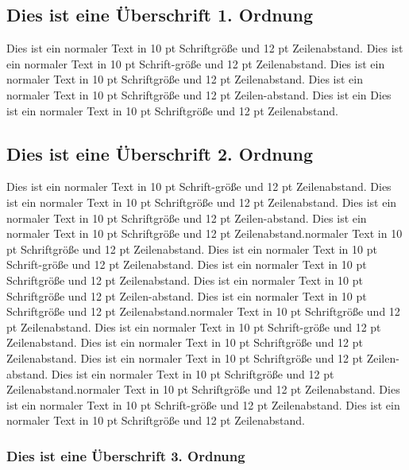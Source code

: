 \documentclass[10pt,a4paper,oneside,abstracton]{scrartcl}
\begin{document}
\begin{multicols}{2}
\section{Dies ist eine Überschrift 1. Ordnung}
Dies ist ein normaler Text in 10 pt Schriftgröße und 12 pt Zeilenabstand. Dies ist ein normaler Text in 10 pt Schrift-größe und 12 pt Zeilenabstand. Dies ist ein normaler Text in 10 pt Schriftgröße und 12 pt Zeilenabstand. Dies ist ein normaler Text in 10 pt Schriftgröße und 12 pt Zeilen-abstand. Dies ist ein Dies ist ein normaler Text in 10 pt Schriftgröße und 12 pt Zeilenabstand.


\subsection{Dies ist eine Überschrift 2. Ordnung}
Dies ist ein normaler Text in 10 pt Schrift-größe und 12 pt Zeilenabstand. Dies ist ein normaler Text in 10 pt Schriftgröße und 12 pt Zeilenabstand.
 Dies ist ein normaler Text in 10 pt Schriftgröße und 12 pt Zeilen-abstand. Dies ist ein normaler Text in 10 pt Schriftgröße und 12 pt Zeilenabstand.normaler Text in 10 pt Schriftgröße und 12 pt Zeilenabstand. Dies ist ein normaler Text in 10 pt Schrift-größe und 12 pt Zeilenabstand. Dies ist ein normaler Text in 10 pt Schriftgröße und 12 pt Zeilenabstand. Dies ist ein normaler Text in 10 pt Schriftgröße und 12 pt Zeilen-abstand. Dies ist ein normaler Text in 10 pt Schriftgröße und 12 pt Zeilenabstand.normaler Text in 10 pt Schriftgröße und 12 pt Zeilenabstand.
Dies ist ein normaler Text in 10 pt Schrift-größe und 12 pt Zeilenabstand. Dies ist ein normaler Text in 10 pt Schriftgröße und 12 pt Zeilenabstand.
 Dies ist ein normaler Text in 10 pt Schriftgröße und 12 pt Zeilen-abstand. Dies ist ein normaler Text in 10 pt Schriftgröße und 12 pt Zeilenabstand.normaler Text in 10 pt Schriftgröße und 12 pt Zeilenabstand. Dies ist ein normaler Text in 10 pt Schrift-größe und 12 pt Zeilenabstand. Dies ist ein normaler Text in 10 pt Schriftgröße und 12 pt Zeilenabstand.

\subsubsection{Dies ist eine Überschrift 3. Ordnung}


\end{multicols}
\end{document}
